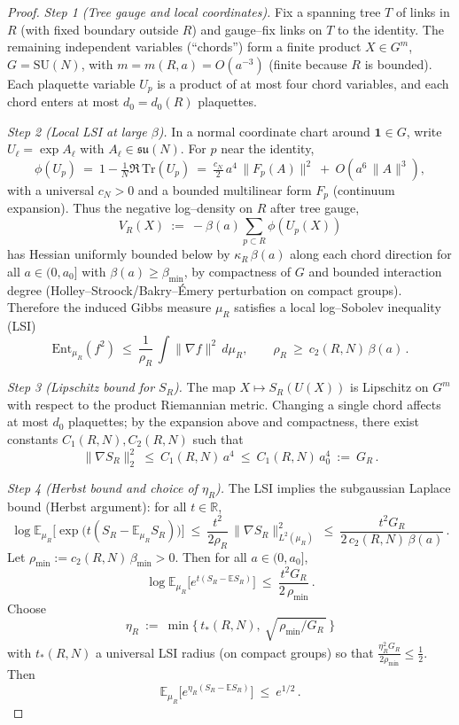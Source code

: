 \documentclass[11pt]{amsart}
\begin{document}
\begin{proof}
\emph{Step 1 (Tree gauge and local coordinates).} Fix a spanning tree $T$ of links in $R$ (with fixed boundary outside $R$) and gauge--fix links on $T$ to the identity. The remaining independent variables (``chords'') form a finite product $X\in G^{m}$, $G=\mathrm{SU}(N)$, with $m=m(R,a)=O(a^{-3})$ (finite because $R$ is bounded). Each plaquette variable $U_p$ is a product of at most four chord variables, and each chord enters at most $d_0=d_0(R)$ plaquettes.

\emph{Step 2 (Local LSI at large $\beta$).} In a normal coordinate chart around $\mathbf{1}\in G$, write $U_\ell=\exp A_\ell$ with $A_\ell\in\mathfrak{su}(N)$. For $p$ near the identity,
\[
  \phi(U_p)\ =\ 1-\tfrac{1}{N}\Re\,\mathrm{Tr}(U_p)
  \ =\ \tfrac{c_N}{2}\,a^4\,\|F_p(A)\|^2\ +\ O(a^6\,\|A\|^3),
\]
with a universal $c_N>0$ and a bounded multilinear form $F_p$ (continuum expansion). Thus the negative log--density on $R$ after tree gauge,
\[
  V_R(X)\ :=\ -\beta(a)\sum_{p\subset R}\phi(U_p(X))
\]
has Hessian uniformly bounded below by $\kappa_R\,\beta(a)$ along each chord direction for all $a\in(0,a_0]$ with $\beta(a)\ge \beta_{\min}$, by compactness of $G$ and bounded interaction degree (Holley--Stroock/Bakry--\'Emery perturbation on compact groups). Therefore the induced Gibbs measure $\mu_R$ satisfies a local log--Sobolev inequality (LSI)
\[
  \mathrm{Ent}_{\mu_R}(f^2)\ \le\ \frac{1}{\rho_R}\,\int \|\nabla f\|^2\,d\mu_R,
  \qquad \rho_R\ \ge\ c_2(R,N)\,\beta(a)\,.
\]

\emph{Step 3 (Lipschitz bound for $S_R$).} The map $X\mapsto S_R(U(X))$ is Lipschitz on $G^{m}$ with respect to the product Riemannian metric. Changing a single chord affects at most $d_0$ plaquettes; by the expansion above and compactness, there exist constants $C_1(R,N),C_2(R,N)$ such that
\[
  \|\nabla S_R\|_2^2\ \le\ C_1(R,N)\,a^4\ \le\ C_1(R,N)\,a_0^4\ :=\ G_R\,.
\]

\emph{Step 4 (Herbst bound and choice of $\eta_R$).} The LSI implies the subgaussian Laplace bound (Herbst argument): for all $t\in\mathbb{R}$,
\[
  \log\mathbb{E}_{\mu_R}\big[\exp\big(t(S_R-\mathbb{E}_{\mu_R}S_R)\big)\big]
  \ \le\ \frac{t^2}{2\rho_R}\,\|\nabla S_R\|_{L^2(\mu_R)}^2
  \ \le\ \frac{t^2 G_R}{2\,c_2(R,N)\,\beta(a)}\,.
\]
Let $\rho_{\min}:=c_2(R,N)\,\beta_{\min}>0$. Then for all $a\in(0,a_0]$,
\[
  \log\mathbb{E}_{\mu_R}\big[e^{t(S_R-\mathbb{E}S_R)}\big]\ \le\ \frac{t^2 G_R}{2\,\rho_{\min}}\,.
\]
Choose
\[
  \eta_R\ :=\ \min\Big\{\,t_*(R,N),\ \sqrt{\,\rho_{\min}/G_R\,}\,\Big\}
\]
with $t_*(R,N)$ a universal LSI radius (on compact groups) so that $\frac{\eta_R^2 G_R}{2\rho_{\min}}\le \tfrac12$. Then
\[
  \mathbb{E}_{\mu_R}\big[e^{\eta_R(S_R-\mathbb{E}S_R)}\big]\ \le\ e^{1/2}\,.
\]


\end{proof}
\end{document}
